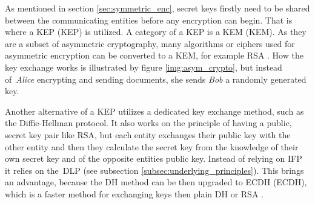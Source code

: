 As mentioned in section \ref{sec:symmetric_enc}, secret keys firstly need to be shared between the communicating entities before any encryption can begin. That is where a KEP (\acl{KEP}) is utilized. A category of a KEP is a KEM (\acl{KEM}). As they are a subset of asymmetric cryptography, many algorithms or ciphers used for asymmetric encryption can be converted to a KEM, for example RSA \cite{Ristic2014}. How the key exchange works is illustrated by figure \ref{img:asym_crypto}, but instead of~\textit{Alice} encrypting and sending documents, she sends \textit{Bob} a randomly generated key.

Another alternative of a KEP utilizes a dedicated key exchange method, such as the Diffie-Hellman protocol. It also works on the principle of having a public, secret key pair like RSA, but each entity exchanges their public key with the other entity and then they calculate the secret key from the knowledge of their own secret key and of the opposite entities public key. Instead of relying on IFP it relies on the~DLP (see subsection \ref{subsec:underlying_principles}). This brings an advantage, because the DH method can be then upgraded to \acl{ECDH} (ECDH), which is a faster method for exchanging keys then plain DH or RSA \cite{Ristic2014}.
